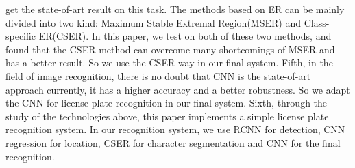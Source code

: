 \begin{enabstract}
get the state-of-art result on this task. The methods based on ER can be mainly
divided into two kind: Maximum Stable Extremal Region(MSER) and Class-specific
ER(CSER). In this paper, we test on both of these two methods, and found that
the CSER method can overcome many shortcomings of MSER and has a better result.
So we use the CSER way in our final system.
Fifth, in the field of image recognition, there is no doubt that CNN is the
state-of-art approach currently, it has a higher accuracy and a better
robustness. So we adapt the CNN for license plate recognition in our final
system.
Sixth, through the study of the technologies above, this paper implements a
simple license plate recognition system. In our recognition system, we use RCNN
for detection, CNN regression for location, CSER for character segmentation and
CNN for the final recognition.\cite{Ren:2015ug}
\end{enabstract}
